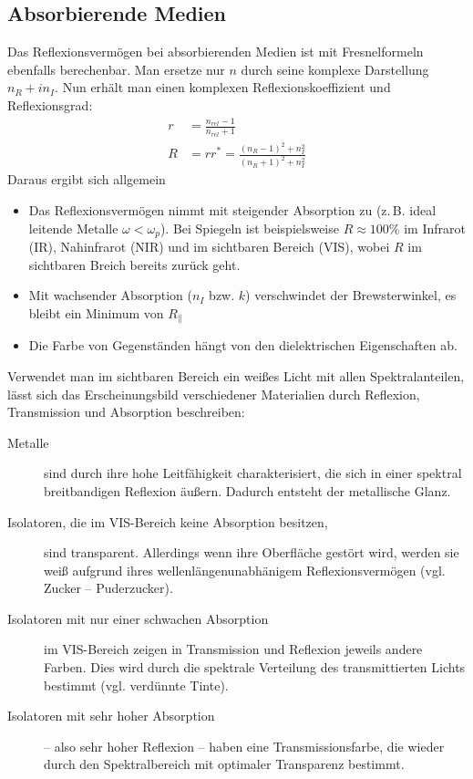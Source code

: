 
\subsection{Absorbierende Medien}
Das Reflexionsvermögen bei absorbierenden Medien ist mit
Fresnelformeln ebenfalls berechenbar. 
Man ersetze nur $n$ durch seine komplexe Darstellung $n_R+in_I$. Nun
erhält man einen komplexen Reflexionskoeffizient und
Reflexionsgrad:
\begin{align*}
  r &= \frac{n_{rel}-1}{n_{rel}+1}\\
  R &= rr^*=\frac{(n_R-1)^2+n_I^2}{(n_R+1)^2+n_I^2}
\end{align*}
Daraus ergibt sich allgemein
\begin{itemize}
\item Das Reflexionsvermögen nimmt mit steigender Absorption
  zu (z.\,B. ideal leitende Metalle $\omega<\omega_p$). Bei Spiegeln
  ist beispielsweise $R\approx100\%$ im Infrarot (IR), Nahinfrarot
  (NIR) und im sichtbaren Bereich (VIS), wobei $R$ im sichtbaren
  Breich bereits zurück geht.
\item Mit wachsender Absorption ($n_I$ bzw. $k$) verschwindet der Brewsterwinkel, es bleibt ein Minimum von $R_{\parallel}$
\item Die Farbe von Gegenständen hängt von den dielektrischen Eigenschaften ab.
\end{itemize}

Verwendet man im sichtbaren Bereich ein weißes Licht mit allen
Spektralanteilen, lässt sich das Erscheinungsbild verschiedener
Materialien durch Reflexion, Transmission und Absorption beschreiben:
\begin{description}
\item[Metalle] sind durch ihre hohe Leitfähigkeit
  charakterisiert, die sich in einer spektral breitbandigen Reflexion
  äußern. Dadurch entsteht der metallische Glanz.
\item[Isolatoren, die im VIS-Bereich keine Absorption besitzen,]
  sind transparent. Allerdings wenn ihre Oberfläche gestört wird,
  werden sie weiß aufgrund ihres wellenlängenunabhänigem
  Reflexionsvermögen (vgl. Zucker -- Puderzucker). 
\item[Isolatoren mit nur einer schwachen Absorption] im VIS-Bereich
  zeigen in Transmission und Reflexion jeweils andere Farben. Dies
  wird durch die spektrale Verteilung des transmittierten Lichts
  bestimmt (vgl. verdünnte Tinte). 
\item[Isolatoren mit sehr hoher Absorption] -- also sehr hoher
  Reflexion -- haben eine Transmissionsfarbe, die wieder durch den
  Spektralbereich mit optimaler Transparenz bestimmt.
\end{description}


